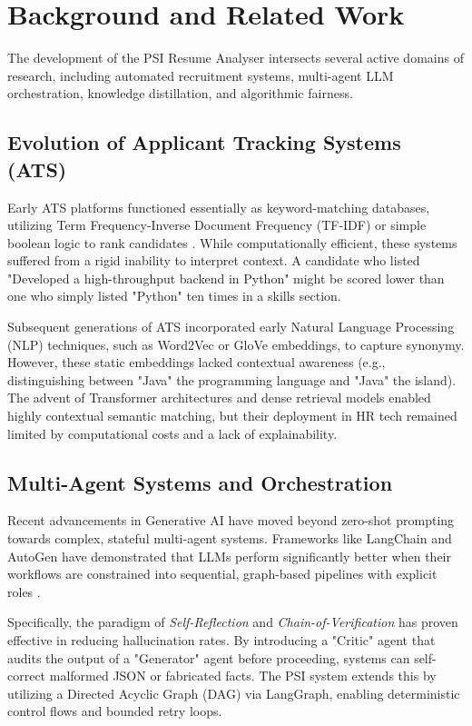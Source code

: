 \section{Background and Related Work}\label{sec:background}

The development of the PSI Resume Analyser intersects several active domains of research, including automated recruitment systems, multi-agent LLM orchestration, knowledge distillation, and algorithmic fairness.

\subsection{Evolution of Applicant Tracking Systems (ATS)}
Early ATS platforms functioned essentially as keyword-matching databases, utilizing Term Frequency-Inverse Document Frequency (TF-IDF) or simple boolean logic to rank candidates \cite{ats_evolution}. While computationally efficient, these systems suffered from a rigid inability to interpret context. A candidate who listed "Developed a high-throughput backend in Python" might be scored lower than one who simply listed "Python" ten times in a skills section.

Subsequent generations of ATS incorporated early Natural Language Processing (NLP) techniques, such as Word2Vec or GloVe embeddings, to capture synonymy. However, these static embeddings lacked contextual awareness (e.g., distinguishing between "Java" the programming language and "Java" the island). The advent of Transformer architectures \cite{attention_is_all_you_need} and dense retrieval models enabled highly contextual semantic matching, but their deployment in HR tech remained limited by computational costs and a lack of explainability.

\subsection{Multi-Agent Systems and Orchestration}
Recent advancements in Generative AI have moved beyond zero-shot prompting towards complex, stateful multi-agent systems. Frameworks like LangChain and AutoGen have demonstrated that LLMs perform significantly better when their workflows are constrained into sequential, graph-based pipelines with explicit roles \cite{multi_agent_llm}. 

Specifically, the paradigm of \textit{Self-Reflection} and \textit{Chain-of-Verification} has proven effective in reducing hallucination rates. By introducing a "Critic" agent that audits the output of a "Generator" agent before proceeding, systems can self-correct malformed JSON or fabricated facts. The PSI system extends this by utilizing a Directed Acyclic Graph (DAG) via LangGraph, enabling deterministic control flows and bounded retry loops.

